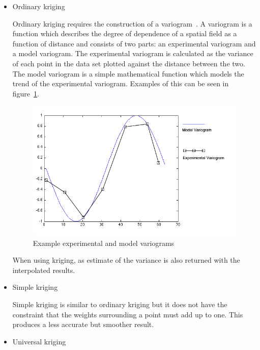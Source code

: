 \begin{itemize}
	\item Ordinary kriging

		Ordinary kriging requires the construction of a variogram~\cite{ordinarykriging}. A variogram is a function which describes the degree of dependence of a spatial field as a function of distance and consists of two parts: an experimental variogram and a model variogram. The experimental variogram is calculated as the variance of each point in the data set plotted against the distance between the two. The model variogram is a simple mathematical function which models the trend of the experimental variogram. Examples of this can be seen in figure~\ref{fig:ordinarykrigingexample}.

		\begin{figure}[H]
        	\begin{center}
                \includegraphics[scale=0.75]{./images/mpp1/KrigingModelFunction.png}
                \caption{Example experimental and model variograms}
                \label{fig:ordinarykrigingexample}
        	\end{center}
		\end{figure}

		When using kriging, as estimate of the variance is also returned with the interpolated results.

	\item Simple kriging

		Simple kriging is similar to ordinary kriging but it does not have the constraint that the weights surrounding a point must add up to one. This produces a less accurate but smoother result. ~\cite{simplekriging}

	\item Universal kriging


\end{itemize}
